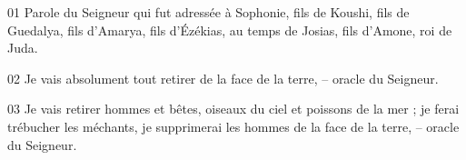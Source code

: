 01 Parole du Seigneur qui fut adressée à Sophonie, fils de Koushi, fils de Guedalya, fils d’Amarya, fils d’Ézékias, au temps de Josias, fils d’Amone, roi de Juda.

02 Je vais absolument tout retirer de la face de la terre, – oracle du Seigneur.

03 Je vais retirer hommes et bêtes, oiseaux du ciel et poissons de la mer ; je ferai trébucher les méchants, je supprimerai les hommes de la face de la terre, – oracle du Seigneur.
